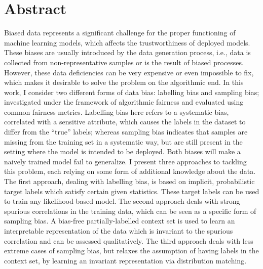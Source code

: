 \begingroup
\let\clearpage\relax
\let\cleardoublepage\relax
\let\cleardoublepage\relax

\chapter*{Abstract}
Biased data represents a significant challenge for the proper functioning of machine learning models,
which affects the trustworthiness of deployed models.
These biases are usually introduced by the data generation process,
i.e., data is collected from non-representative samples or is the result of biased processes.
However, these data deficiencies can be very expensive or even impossible to fix,
which makes it desirable to solve the problem on the algorithmic end.
In this work, I consider two different forms of data bias:
labelling bias and sampling bias;
investigated under the framework of algorithmic fairness and evaluated using common fairness metrics.
Labelling bias here refers to a systematic bias,
correlated with a sensitive attribute,
which causes the labels in the dataset to differ from the ``true'' labels;
whereas sampling bias indicates that samples are missing from the training set in a systematic way,
but are still present in the setting where the model is intended to be deployed.
Both biases will make a naively trained model fail to generalize.
I present three approaches to tackling this problem, each relying on some form of additional knowledge about the data.
The first approach, dealing with labelling bias, is based on implicit, probabilistic target labels
which satisfy certain given statistics.
These target labels can be used to train any likelihood-based model.
The second approach deals with strong spurious correlations in the training data,
which can be seen as a specific form of sampling bias.
A bias-free partially-labelled context set is used to learn an interpretable representation of the data
which is invariant to the spurious correlation and can be assessed qualitatively.
The third approach deals with less extreme cases of sampling bias,
but relaxes the assumption of having labels in the context set,
by learning an invariant representation via distribution matching.

\endgroup

\vfill
